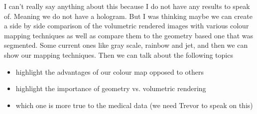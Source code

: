 I can't really say anything about this because I do not have any results to speak of.  Meaning we do not have a hologram.  But I was thinking maybe we can create a side by side comparison of the volumetric rendered images with various colour mapping techniques as well as compare them to the geometry based one that was segmented.  Some current ones like gray scale, rainbow and jet, and then we can show our mapping techniques. Then we can talk about the following topics
\begin{itemize}
    \item highlight the advantages of our colour map opposed to others
    \item highlight the importance of geometry vs. volumetric rendering 
    \item which one is more true to the medical data (we need Trevor to speak on this)
\end{itemize}

